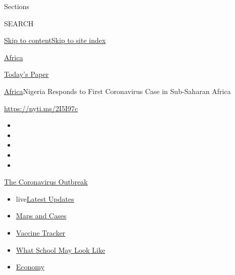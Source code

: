 Sections

SEARCH

\protect\hyperlink{site-content}{Skip to
content}\protect\hyperlink{site-index}{Skip to site index}

\href{https://www.nytimes.com/section/world/africa}{Africa}

\href{https://myaccount.nytimes.com/auth/login?response_type=cookie\&client_id=vi}{}

\href{https://www.nytimes.com/section/todayspaper}{Today's Paper}

\href{/section/world/africa}{Africa}\textbar{}Nigeria Responds to First
Coronavirus Case in Sub-Saharan Africa

\url{https://nyti.ms/2I5I97c}

\begin{itemize}
\item
\item
\item
\item
\item
\end{itemize}

\href{https://www.nytimes.com/news-event/coronavirus?action=click\&pgtype=Article\&state=default\&region=TOP_BANNER\&context=storylines_menu}{The
Coronavirus Outbreak}

\begin{itemize}
\tightlist
\item
  live\href{https://www.nytimes.com/2020/08/01/world/coronavirus-covid-19.html?action=click\&pgtype=Article\&state=default\&region=TOP_BANNER\&context=storylines_menu}{Latest
  Updates}
\item
  \href{https://www.nytimes.com/interactive/2020/us/coronavirus-us-cases.html?action=click\&pgtype=Article\&state=default\&region=TOP_BANNER\&context=storylines_menu}{Maps
  and Cases}
\item
  \href{https://www.nytimes.com/interactive/2020/science/coronavirus-vaccine-tracker.html?action=click\&pgtype=Article\&state=default\&region=TOP_BANNER\&context=storylines_menu}{Vaccine
  Tracker}
\item
  \href{https://www.nytimes.com/interactive/2020/07/29/us/schools-reopening-coronavirus.html?action=click\&pgtype=Article\&state=default\&region=TOP_BANNER\&context=storylines_menu}{What
  School May Look Like}
\item
  \href{https://www.nytimes.com/live/2020/07/31/business/stock-market-today-coronavirus?action=click\&pgtype=Article\&state=default\&region=TOP_BANNER\&context=storylines_menu}{Economy}
\end{itemize}

